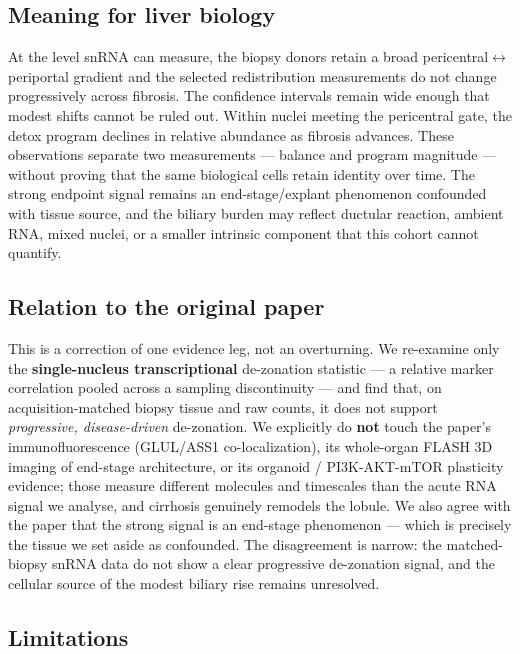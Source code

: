 \documentclass[11pt,a4paper]{article}
\begin{document}
\subsection{Meaning for liver biology}

At the level snRNA can measure, the biopsy donors retain a broad pericentral$\leftrightarrow$periportal gradient and the selected redistribution measurements do not change progressively across fibrosis. The confidence intervals remain wide enough that modest shifts cannot be ruled out. Within nuclei meeting the pericentral gate, the detox program declines in relative abundance as fibrosis advances. These observations separate two measurements --- balance and program magnitude --- without proving that the same biological cells retain identity over time. The strong endpoint signal remains an end-stage/explant phenomenon confounded with tissue source, and the biliary burden may reflect ductular reaction, ambient RNA, mixed nuclei, or a smaller intrinsic component that this cohort cannot quantify.

\subsection{Relation to the original paper}

This is a correction of one evidence leg, not an overturning. We re-examine only the \textbf{single-nucleus transcriptional} de-zonation statistic --- a relative marker correlation pooled across a sampling discontinuity --- and find that, on acquisition-matched biopsy tissue and raw counts, it does not support \emph{progressive, disease-driven} de-zonation. We explicitly do \textbf{not} touch the paper's immunofluorescence (GLUL/ASS1 co-localization), its whole-organ FLASH 3D imaging of end-stage architecture, or its organoid / PI3K-AKT-mTOR plasticity evidence; those measure different molecules and timescales than the acute RNA signal we analyse, and cirrhosis genuinely remodels the lobule. We also agree with the paper that the strong signal is an end-stage phenomenon --- which is precisely the tissue we set aside as confounded. The disagreement is narrow: the matched-biopsy snRNA data do not show a clear progressive de-zonation signal, and the cellular source of the modest biliary rise remains unresolved.

\subsection{Limitations}
\end{document}
